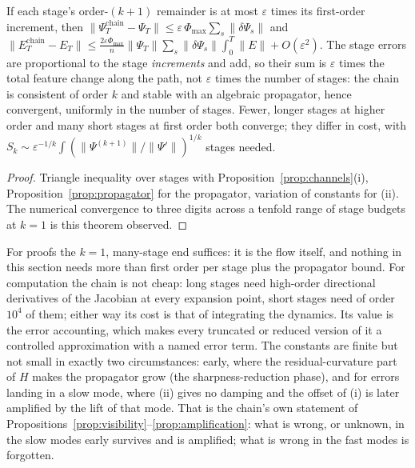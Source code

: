 \begin{theorem}
\label{thm:global-error}
If each stage's order-$(k{+}1)$ remainder is at most $\varepsilon$ times its
first-order increment, then
$\|\Psi_T^{\mathrm{chain}}-\Psi_T\|\le\varepsilon\,\Phi_{\max}\sum_s\|\delta\Psi_s\|$ and
$\|E_T^{\mathrm{chain}}-E_T\|\le\frac{2\varepsilon\Phi_{\max}}n\|\Psi_T\|\sum_s\|\delta\Psi_s\|\int_0^T\|E\|+O(\varepsilon^2)$.
The stage errors are proportional to the stage \emph{increments} and add, so
their sum is $\varepsilon$ times the total feature change along the path, not
$\varepsilon$ times the number of stages: the chain is consistent of order $k$
and stable with an algebraic propagator, hence convergent, uniformly in the
number of stages. Fewer, longer stages at higher order and many short stages
at first order both converge; they differ in cost, with
$S_k\sim\varepsilon^{-1/k}\int(\|\Psi^{(k+1)}\|/\|\Psi'\|)^{1/k}$ stages needed.
\end{theorem}
\begin{proof}
Triangle inequality over stages with Proposition~\ref{prop:channels}(i),
Proposition~\ref{prop:propagator} for the propagator, variation of constants
for (ii). The numerical convergence to three digits across a tenfold range of
stage budgets at $k=1$ is this theorem observed.
\end{proof}

\begin{remark}
For proofs the $k=1$, many-stage end suffices: it is the flow itself, and
nothing in this section needs more than first order per stage plus the
propagator bound. For computation the chain is not cheap: long stages need
high-order directional derivatives of the Jacobian at every expansion point,
short stages need of order $10^4$ of them; either way its cost is that of
integrating the dynamics. Its value is the error accounting, which makes
every truncated or reduced version of it a controlled approximation with a
named error term. The constants are finite but not small in exactly two
circumstances: early, where the residual-curvature part of $H$ makes the
propagator grow (the sharpness-reduction phase), and for errors landing in a
slow mode, where (ii) gives no damping and the offset of (i) is later
amplified by the lift of that mode. That is the chain's own statement of
Propositions~\ref{prop:visibility}--\ref{prop:amplification}: what is wrong,
or unknown, in the slow modes early survives and is amplified; what is wrong
in the fast modes is forgotten.
\end{remark}


